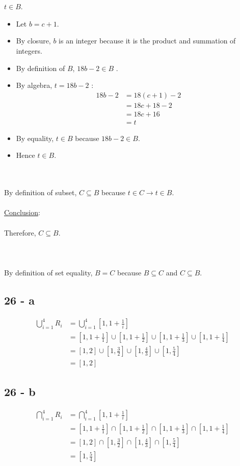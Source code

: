 \documentclass[12pt]{article}
\newcommand{\xlist}[1]{
    \begin{itemize}
        \renewcommand{\labelitemi}{$\centerdot$}
        #1
    \end{itemize}
    \newblock
    \\ \\
}
\newcommand{\xconclusion}[1]{
    \underline{Conclusion}:
    \\ \\
    #1
    \\ \\
}
\begin{document}
\\ \\
$t \in B$.
\xlist{
    \item Let $b = c+1$.
    \item By closure, $b$ is an integer because it is the product and summation of integers.
    \item By definition of $B$, $18b - 2 \in B$ .
    \item By algebra, $t = 18b - 2$ :
    \begin{align*}
        18b - 2 &= 18(c+1) - 2 \\
        &= 18c + 18 - 2 \\
        &= 18c + 16 \\
        &= t
    \end{align*}
    \item By equality, $t \in B$ because $18b - 2 \in B$.
    \item Hence $t \in B$.
}
By definition of subset, $C \subseteq B$ because $t \in C \rightarrow t \in B$.
\\ \\
\xconclusion{Therefore, $C \subseteq B$.}
\\ \\
By definition of set equality, $B = C$ because $B \subseteq C$ and $C \subseteq B$.
\subsection*{26 - a}
\begin{align*}
    \bigcup_{i=1}^{4} R_i &= \bigcup_{i=1}^{4} \left[1, 1 + \frac{1}{i}\right] \\
    &= \left[1, 1 + \frac{1}{1}\right]\cup \left[1, 1 + \frac{1}{2}\right]\cup \left[1, 1 + \frac{1}{3}\right]\cup \left[1, 1 + \frac{1}{4}\right] \\
    &= \left[1, 2\right] \cup \left[1, \frac{3}{2}\right] \cup \left[1, \frac{4}{3}\right] \cup \left[1, \frac{5}{4}\right] \\
    &= \left[1, 2\right]
\end{align*}
\subsection*{26 - b}
\begin{align*}
    \bigcap_{i=1}^{4} R_i &= \bigcap_{i=1}^{4} \left[1, 1 + \frac{1}{i}\right] \\
    &= \left[1, 1 + \frac{1}{1}\right]\cap \left[1, 1 + \frac{1}{2}\right]\cap \left[1, 1 + \frac{1}{3}\right]\cap \left[1, 1 + \frac{1}{4}\right] \\
    &= \left[1, 2\right] \cap \left[1, \frac{3}{2}\right] \cap \left[1, \frac{4}{3}\right] \cap \left[1, \frac{5}{4}\right] \\
    &= \left[1, \frac{5}{4}\right]
\end{align*}
\end{document}
